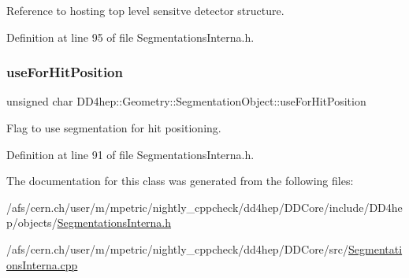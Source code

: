 Reference to hosting top level sensitve detector structure. 



Definition at line 95 of file Segmentations\+Interna.\+h.

\hypertarget{class_d_d4hep_1_1_geometry_1_1_segmentation_object_a50926f063e074096e83ee667d70114a7}{}\label{class_d_d4hep_1_1_geometry_1_1_segmentation_object_a50926f063e074096e83ee667d70114a7} 
\subsubsection{\texorpdfstring{use\+For\+Hit\+Position}{useForHitPosition}}
{\footnotesize\ttfamily unsigned char D\+D4hep\+::\+Geometry\+::\+Segmentation\+Object\+::use\+For\+Hit\+Position}



Flag to use segmentation for hit positioning. 



Definition at line 91 of file Segmentations\+Interna.\+h.



The documentation for this class was generated from the following files\+:\begin{DoxyCompactItemize}
\item 
/afs/cern.\+ch/user/m/mpetric/nightly\+\_\+cppcheck/dd4hep/\+D\+D\+Core/include/\+D\+D4hep/objects/\hyperlink{_segmentations_interna_8h}{Segmentations\+Interna.\+h}\item 
/afs/cern.\+ch/user/m/mpetric/nightly\+\_\+cppcheck/dd4hep/\+D\+D\+Core/src/\hyperlink{_segmentations_interna_8cpp}{Segmentations\+Interna.\+cpp}\end{DoxyCompactItemize}
